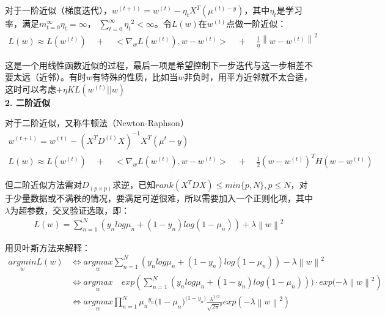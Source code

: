 \documentclass[12pt,UTF8,AutoFakeBold]{article}
\begin{document}
对于一阶近似（梯度迭代），$w^{(t+1)}=w^{(t)}-{\eta}_tX^T({\mu}^{(t)-y})$，其中${\eta}_t$是学习率，满足$m _{ t=0 }^{ \infty  }{ { \eta  }_{ t }=\infty  } $， $\sum _{ t=0 }^{ \infty  }{ { { \eta  }_{ t } }^{ 2 }<\infty  } $。令$L(w)$在$w^{(t)}$点做一阶近似：
\begin{gather}
L(w)\approx L({ w }^{ (t) })\quad +\quad <{ \nabla  }_{ w }L({ w }^{ (t) }),w-{ w }^{ (t) }>\quad +\quad \frac { 1 }{ \eta  } { \left\| w-{ w }^{ (t) } \right\|  }^{ 2 }
\end{gather}

这是一个用线性函数近似的过程，最后一项是希望控制下一步迭代与这一步相差不要太远（近邻）。有时$w$有特殊的性质，比如当$w$非负时，用平方近邻就不太合适，这时可以考虑$+\eta KL(w^{(t)}||w)$\\
\textbf{2. 二阶近似}

对于二阶近似，又称牛顿法（Newton-Raphson）
\begin{gather}
w^{ (t+1) }=w^{ (t) }-{ ({ X }^{ T }{ D }^{ (t) }X) }^{ -1 }{ X }^{ T }({ \mu  }^{ t }-y)\\ 
L(w)\approx L({ w }^{ (t) })\quad +\quad <{ \nabla  }_{ w }L({ w }^{ (t) }),w-{ w }^{ (t) }>\quad +\quad \frac { 1 }{ 2 } { (w-{ w }^{ (t) }) }^{ T }H(w-{ w }^{ (t) })
\end{gather}

但二阶近似方法需对$D_{(p\times p)}$求逆，已知$rank(X^TDX)\le min\{p,N\}, p\le N$，对于少量数据或不满秩的情况，要满足可逆很难，所以需要加入一个正则化项，其中$\lambda$为超参数，交叉验证选取，即：
\begin{gather}
 L(w)=\sum _{ n=1 }^{ N }{ ({ y }_{ n }log{ \mu  }_{ n }+(1-{ y }_{ n })log(1-{ \mu  }_{ n }))+\lambda { \left\| w \right\|  }^{ 2 } } 
\end{gather}

用贝叶斯方法来解释：
\begin{equation}
\begin{aligned}
\underset { w }{ argmin } L(w) &\Leftrightarrow \underset { w }{ argmax } \sum _{ n=1 }^{ N }{ ({ y }_{ n }log{ \mu  }_{ n }+(1-{ y }_{ n })log(1-{ \mu  }_{ n }))-\lambda { \left\| w \right\|  }^{ 2 } } \\ 
&\Leftrightarrow \underset { w }{ argmax } \quad exp(\sum _{ n=1 }^{ N }{ ({ y }_{ n }log{ \mu  }_{ n }+(1-{ y }_{ n })log(1-{ \mu  }_{ n })))\cdot exp(-\lambda { \left\| w \right\|  }^{ 2 } } )\\ 
&\Leftrightarrow \underset { w }{ argmax } \prod _{ n=1 }^{ N }{ { { \mu  }_{ n } }^{ { y }_{ n } } } { { (1-\mu  }_{ n }) }^{ { (1-y }_{ n }) }\frac { { \lambda  }^{ 1/2 } }{ { \sqrt { 2\pi  }  }^{ p } } exp(-\lambda { \left\| w \right\|  }^{ 2 })
\end{aligned}
\end{equation}
\end{document}

